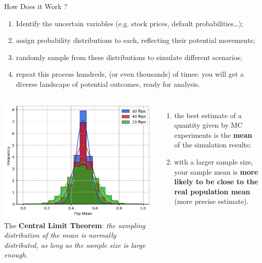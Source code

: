 \documentclass{beamer}
\begin{document}
\begin{frame}{How Does it Work ?}
\begin{enumerate}
	\item Identify the uncertain variables (e.g. stock prices, default probabilities\ldots);
	\item assign probability distributions to each, reflecting their potential movements;
	\item randomly sample from these distributions to simulate different scenarios;
	\item repeat this process hundreds, (or even thousands) of times: you will get a diverse landscape of potential outcomes, ready for analysis.
\end{enumerate}
\vspace{0.25cm}
\begin{columns}
	\hfill
	\includegraphics[width=0.8\linewidth]{central_limit_theorem}
	\vspace{0.7cm}
	The \textbf{Central Limit Theorem}: \emph{the sampling distribution of the mean is normally distributed, as long as the sample size is large enough}.
	
	\begin{enumerate}
		\item the best estimate of a quantity given by MC experiments is the \textbf{mean} of the simulation results;
		\item with a larger sample size, your sample mean is \textbf{more likely to be close to the real population mean} (more precise estimate).
	\end{enumerate}
\end{columns}
\end{frame}
\end{document}
